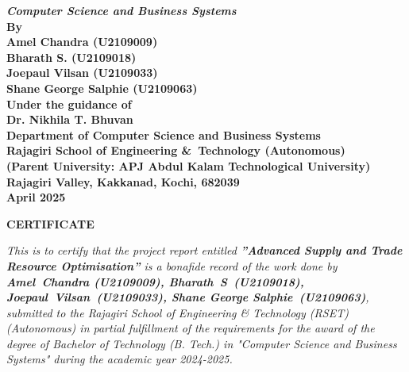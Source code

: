 \begin{center}
	{\Large \bf \itshape{{Computer Science and Business Systems}}}\\[1cm]
	\large \bfseries{By}\\[.2cm]
	\large \bfseries{Amel Chandra (U2109009)}\\[0.3cm]
	\large \bfseries{Bharath S. (U2109018)}\\[0.3cm]
	\large \bfseries{Joepaul Vilsan (U2109033)}\\[0.3cm]
	\large \bfseries{Shane George Salphie (U2109063)}\\[0.3cm]
	\large \bfseries{Under the guidance of}\\[0.5cm]
	\large \bfseries{Dr. Nikhila T. Bhuvan}\\[0.3cm]
	\large \textbf{Department of Computer Science and Business Systems}\\
	\large \textbf{Rajagiri School of Engineering \&\ Technology (Autonomous)}\\
	\small \bfseries{(Parent University: APJ Abdul Kalam Technological University)}\\
	\large \textbf{Rajagiri Valley, Kakkanad, Kochi, 682039}\\
	\large \bfseries{April 2025}
\end{center}

\newpage
\thispagestyle{empty}
\vspace{1cm}
\begin{center}

	\large \bfseries{\huge{CERTIFICATE}}\\[1cm]
\end{center}

\renewcommand{\baselinestretch}{1.2}\normalsize

\sloppy
\emph{This is to certify that the project report entitled \textbf{”Advanced Supply and Trade Resource Optimisation”} is a bonafide record of the work done by \textbf{\mbox{Amel Chandra} (U2109009), \mbox{Bharath S (U2109018)}, \mbox{Joepaul Vilsan (U2109033)}, \mbox{Shane} \mbox{George} \mbox{Salphie (U2109063)}}, submitted to the Rajagiri School of Engineering \& Technology (RSET) (Autonomous) in partial fulfillment of the requirements for the award of the degree of Bachelor of Technology (B. Tech.) in "Computer Science and Business Systems" during the academic year 2024-2025.}\\[2.5cm]

